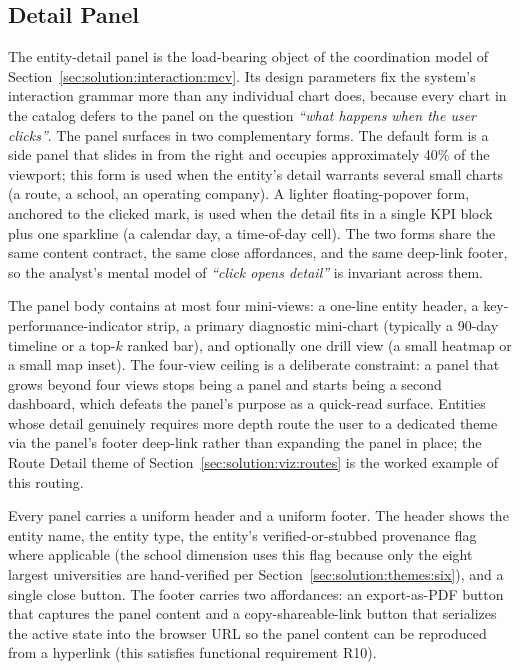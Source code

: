 \subsection{Detail Panel}
\label{sec:solution:interaction:detail}

The entity-detail panel is the load-bearing object of the coordination
model of Section~\ref{sec:solution:interaction:mcv}. Its design
parameters fix the system's interaction grammar more than any
individual chart does, because every chart in the catalog defers to
the panel on the question \textit{``what happens when the user clicks''}.
The panel surfaces in two complementary forms. The default form is a
side panel that slides in from the right and occupies approximately
40\% of the viewport; this form is used when the entity's detail
warrants several small charts (a route, a school, an operating
company). A lighter floating-popover form, anchored to the clicked
mark, is used when the detail fits in a single KPI block plus one
sparkline (a calendar day, a time-of-day cell). The two forms share
the same content contract, the same close affordances, and the same
deep-link footer, so the analyst's mental model of \textit{``click
opens detail''} is invariant across them.

The panel body contains at most four mini-views: a one-line entity
header, a key-performance-indicator strip, a primary diagnostic mini-chart
(typically a 90-day timeline or a top-$k$ ranked bar), and optionally
one drill view (a small heatmap or a small map inset). The four-view
ceiling is a deliberate constraint: a panel that grows beyond four
views stops being a panel and starts being a second dashboard, which
defeats the panel's purpose as a quick-read surface. Entities whose
detail genuinely requires more depth route the user to a dedicated
theme via the panel's footer deep-link rather than expanding the panel
in place; the Route Detail theme of Section~\ref{sec:solution:viz:routes}
is the worked example of this routing.

Every panel carries a uniform header and a uniform footer. The header
shows the entity name, the entity type, the entity's verified-or-stubbed
provenance flag where applicable (the school dimension uses this flag
because only the eight largest universities are hand-verified per
Section~\ref{sec:solution:themes:six}), and a single close button. The
footer carries two affordances: an export-as-PDF button that captures
the panel content and a copy-shareable-link button that serializes the
active state into the browser URL so the panel content can be
reproduced from a hyperlink (this satisfies functional requirement
R10).

